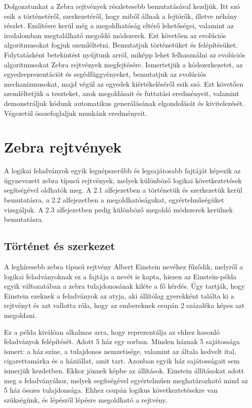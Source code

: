 \documentclass[12pt,a4paper,oneside]{report}
\begin{document}
	Dolgozatunkat a Zebra rejtvények részletesebb bemutatásával kezdjük.
    Itt szó esik a történetéről, szerkezetéről, hogy miből állnak a fejtörők, illetve néhány részlet.
    Említésre kerül még a megoldhatóság eltérő lehetőségei, valamint az irodalomban megtalálható megoldó módszerek. Ezt követően az evolúciós algoritmusokat fogjuk szemléltetni.
    Bemutatjuk történetüket és felépítésüket.
    Folytatásként betekintést nyújtunk arról, miképp lehet felhasználni az evolúciós algoritmusokat Zebra rejtvények megfejtésére.
    Ismertetjük a kódszerkezetet, az egyedreprezentációt és segédfüggvényeket, bemutatjuk az evolúciós mechanizmusokat, majd végül az egyedek kiértékeléséről esik szó.
    Ezt követően szemléltetjük a teszteket, azok megoldásait és futtatási eredményeit, valamint demonstráljuk kódunk automatikus generálásának elgondolását és kivitelezését.
    Végezetül összefoglaljuk munkánk eredményeit.

\chapter{Zebra rejtvények} %

A logikai feladványok egyik legnépszerűbb és legsajátosabb fajtáját képezik az úgynevezett zebra típusú rejtvények, melyek különböző logikai következtetések segítségével oldhatók meg. 
A 2.1 alfejezetben a történetük és szerkezetük kerül bemutatásra, a 2.2 alfejezetben a megoldhatóságukat, egyértelműségüket vizsgáljuk.
A 2.3 alfejezetben pedig különböző megoldó módszerek kerülnek bemutatásra.
    
    \section{Történet és szerkezet} %

A leghíresebb zebra típusú rejtvény Albert Einstein nevéhez fűződik, melyről a logikai feladványoknak ez a fajtája a nevét is kapta, hiszen az Einstein-példa egyik változatában a zebra tulajdonosának kiléte a fő kérdés. 
Úgy tartják, hogy Einstein ezeknek a feladványok az atyja, aki állítólag gyerekként találta ki a rejtvényt és azt vallotta róla, hogy az embereknek csupán 2 százaléka képes azt megoldani.

Ez a példa kiválóan alkalmas arra, hogy reprezentálja az ehhez hasonló feladványok felépítését.
Adott 5 ház egy sorban. Minden háznak 5 sajátossága ismert: a ház színe, a tulajdonos nemzetisége, valamint az általa kedvelt ital, cigarettamárka és a háziállat, amit tart. 
Azonban egyik ház sajátosságait sem ismerjük kezdetben. 
Ekkor jönnek képbe az állítások. Einstein állításokat adott meg a feladványához, melyek segítségével egyértelműen meghatározható mind az 5 ház összes tulajdonsága. 
Ehhez csupán logikus következtetésekre van szükségünk, és lépésről lépésre megoldható a rejtvény.
\end{document}
